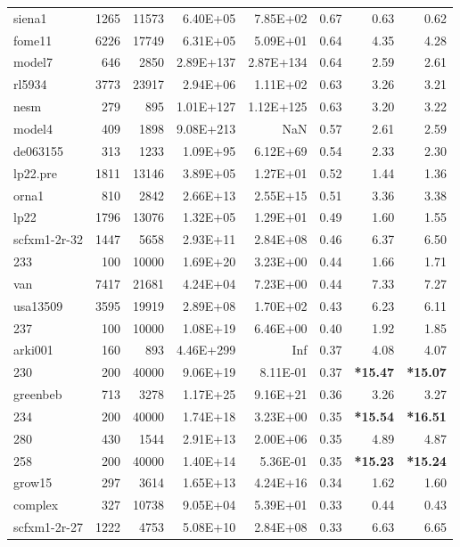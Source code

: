 \documentclass[10pt]{article}
\newcommand{\red}{
	\color{red}	
	}
\begin{document}
\begin{longtable}{|l|r|r|r|r|r|r|r|}
siena1	&	1265	&	11573	&	6.40E+05	&	7.85E+02	&	0.67	&	0.63	&	0.62	\\
fome11	&	6226	&	17749	&	6.31E+05	&	5.09E+01	&	0.64	&	4.35	&	4.28	\\
model7	&	646	&	2850	&	2.89E+137	&	2.87E+134	&	0.64	&	2.59	&	2.61	\\
rl5934	&	3773	&	23917	&	2.94E+06	&	1.11E+02	&	0.63	&	3.26	&	3.21	\\
nesm	&	279	&	895	&	1.01E+127	&	1.12E+125	&	0.63	&	3.20	&	3.22	\\
model4	&	409	&	1898	&	9.08E+213	&	NaN	&	0.57	&	2.61	&	2.59	\\
de063155	&	313	&	1233	&	1.09E+95	&	6.12E+69	&	0.54	&	2.33	&	2.30	\\
lp22.pre	&	1811	&	13146	&	3.89E+05	&	1.27E+01	&	0.52	&	1.44	&	1.36	\\
orna1	&	810	&	2842	&	2.66E+13	&	2.55E+15	&	0.51	&	3.36	&	3.38	\\
lp22	&	1796	&	13076	&	1.32E+05	&	1.29E+01	&	0.49	&	1.60	&	1.55	\\
scfxm1-2r-32	&	1447	&	5658	&	2.93E+11	&	2.84E+08	&	0.46	&	6.37	&	6.50	\\
233	&	100	&	10000	&	1.69E+20	&	3.23E+00	&	0.44	&	1.66	&	1.71	\\
van	&	7417	&	21681	&	4.24E+04	&	7.23E+00	&	0.44	&	7.33	&	7.27	\\
usa13509	&	3595	&	19919	&	2.89E+08	&	1.70E+02	&	0.43	&	6.23	&	6.11	\\
237	&	100	&	10000	&	1.08E+19	&	6.46E+00	&	0.40	&	1.92	&	1.85	\\
arki001	&	160	&	893	&	4.46E+299	&	Inf	&	0.37	&	4.08	&	4.07	\\
230	&	200	&	40000	&	9.06E+19	&	8.11E-01	&	0.37	&	{\bf \red *15.47} 	&	{\bf \red *15.07}	\\
greenbeb	&	713	&	3278	&	1.17E+25	&	9.16E+21	&	0.36	&	3.26	&	3.27	\\
234	&	200	&	40000	&	1.74E+18	&	3.23E+00	&	0.35	&	{\bf \red *15.54} 	&	{\bf \red *16.51} 	\\
280	&	430	&	1544	&	2.91E+13	&	2.00E+06	&	0.35	&	4.89	&	4.87	\\
258	&	200	&	40000	&	1.40E+14	&	5.36E-01	&	0.35	&	{\bf \red *15.23} 	&	{\bf \red *15.24}	\\
grow15	&	297	&	3614	&	1.65E+13	&	4.24E+16	&	0.34	&	1.62	&	1.60	\\
complex	&	327	&	10738	&	9.05E+04	&	5.39E+01	&	0.33	&	0.44	&	0.43	\\
scfxm1-2r-27	&	1222	&	4753	&	5.08E+10	&	2.84E+08	&	0.33	&	6.63	&	6.65	\\

\end{longtable}
\end{document}
